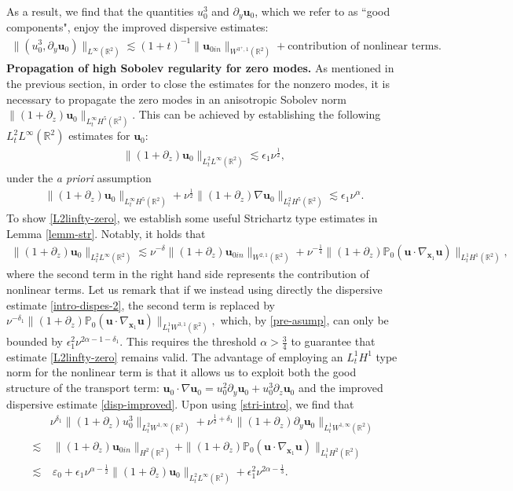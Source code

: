 \documentclass[11pt,reqno]{article}
\numberwithin{equation}{section}
\newcommand\R{{\mathbb R}}
\newcommand\PP{{\mathbb P}}
\newcommand\x{\bm{x}}
\newcommand\uu{\bm{u}}
\let\pa=\partial
\let\na=\nabla
\let\al=\alpha
\let\var=\varepsilon
\let\f=\frac
\let\ep=\epsilon
\begin{document}
As a result, we find that the quantities $u_0^3$ and $\pa_y\uu_0$, which we refer to as ``good components", enjoy the improved dispersive estimates: 
\begin{align}\label{disp-improved}
    \|(u_0^3, \pa_y \uu_0)\|_{L^{\infty}(\R^2)}
	\lesssim (1+t)^{-1} \|\uu_{0in}\|_{W^{3^+,1}(\R^2)}+\text{contribution of nonlinear terms.}
\end{align}
\noindent\textbf{Propagation of high Sobolev regularity for zero modes.} As mentioned in the previous section, in order to close the estimates for the nonzero modes, it is necessary to propagate the zero modes in an anisotropic Sobolev norm
$\|(1+\pa_z)\uu_0\|_{L_t^{\infty}H^5(\R^2)}.$ This can be achieved by establishing the following $L_t^2L^{\infty}(\R^2)$ estimates for $\uu_0:$
\begin{align}\label{L2linfty-zero}
    \|(1+\pa_z)\uu_0\|_{L_t^2L^{\infty}(\R^2)}\lesssim \ep_1 \nu^{\f12},
\end{align}
under the \textit{a priori} assumption 
\begin{align}\label{pre-asump}
    \|(1+\pa_z)\uu_0\|_{L_t^{\infty}H^5(\R^2)}+\nu^{\f12}\|(1+\pa_z)\na\uu_0\|_{L_t^{2}H^5(\R^2)}\lesssim \ep_1 \nu^{\alpha}.
\end{align}
To show \eqref{L2linfty-zero}, we establish some useful Strichartz type estimates in Lemma \ref{lemm-str}. Notably, it holds that 
\begin{align}\label{stri-intro}
	\|(1+\pa_z)\uu_0\|_{L^2_tL^\infty(\R^2)}
	\lesssim \nu^{-\delta}\|(1+\pa_z)\uu_{0in}\|_{W^{2,1}(\R^2)}+\nu^{-\f14}\|(1+\pa_z)\PP_0(\uu\cdot\nabla_{\x_1}  \uu)\|_{L^1_tH^{1}(\R^2)},
\end{align}
where the second term in the right hand side represents the contribution of nonlinear terms. Let us remark that if we instead using directly the dispersive estimate \eqref{intro-dispes-2}, the second term is replaced by 
$\nu^{-\delta_1}\|(1+\pa_z)\PP_0(\uu\cdot\nabla_{\x_1}\uu)\|_{L^1_tW^{3,1}(\R^2)},$ which, by \eqref{pre-asump},
can only be bounded by $\ep_1^2\nu^{2\alpha-1-\delta_1}.$ 
This requires the threshold $\alpha> \f34$ to guarantee that estimate \eqref{L2linfty-zero} remains valid.
The advantage of employing an $L_t^1H^1$ type norm for the nonlinear term is that it allows us to exploit both the good structure of the transport term:
$\uu_0\cdot\nabla\uu_0= u_0^2\pa_y \uu_0+u_0^3\pa_z\uu_0$
and the improved dispersive estimate \eqref{disp-improved}. Upon using \eqref{stri-intro}, we find that 
\begin{align*}
	&\nu^{\delta_1}\|(1+\pa_z)u_0^3\|_{L^2_tW^{1,\infty}(\R^2)}
	+\nu^{\f12+\delta_1}\|(1+\pa_z)\pa_y\uu_0\|_{L^1_tW^{1,\infty}(\R^2)}
	\nonumber
	\\
	\lesssim &~
	\|(1+\pa_z)\uu_{0in}\|_{H^{2}(\R^2)}+\|(1+\pa_z)\PP_0(\uu\cdot\nabla_{\x_1}  \uu)\|_{L^1_tH^{2}(\R^2)}
    \nonumber
    \\
    \lesssim&~\var_0+\ep_1\nu^{\al-\f12}\|(1+\pa_z)\uu_0\|_{L^2_tL^\infty(\R^2)}+\ep_1^2\nu^{2\al-\f13}.
\end{align*}
\end{document}
